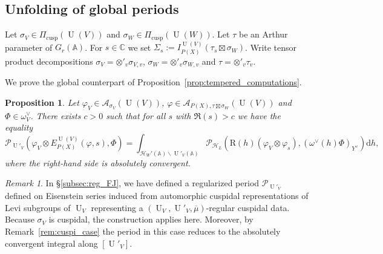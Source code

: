 \documentclass[letterpaper,11pt]{amsart}
\newcommand{\bA}{\mathbb{A}}
\newcommand{\C}{\mathbb{C}}
\newcommand{\cA}{\mathcal{A}}
\newcommand{\cH}{\mathcal{H}}
\newcommand{\cP}{\mathcal{P}}
\newcommand{\rd}{\mathrm{d}}
\newcommand{\<}{\negthickspace}
\DeclareMathOperator{\U}{U}
\DeclareMathOperator{\cusp}{cusp}
\theoremstyle{definition}
\theoremstyle{plain}
\newtheorem{prop}[definition]{Proposition}
\theoremstyle{remark}
\newtheorem{remark}[definition]{Remark}
\numberwithin{equation}{section}
\begin{document}
\subsection{Unfolding of global periods}

Let $\sigma_V \in \Pi_{\cusp}(\U(V))$ and $\sigma_W \in \Pi_{\cusp}(\U(W))$. Let $\tau$ be an Arthur parameter of $G_r(\bA)$. For $s \in \C$ we set $\Sigma_{s}:=I_{P(X)}^{\U(V)} (\tau_s \boxtimes \sigma_W)$. Write tensor product decompositions $\sigma_V=\otimes'_v \sigma_{V,v}$, $\sigma_W=\otimes'_v \sigma_{W,v}$ and $\tau=\otimes'_v \tau_{v}$.

We prove the global counterpart of Proposition~\ref{prop:tempered_computations}.

\begin{prop}
\label{prop:global_corank_reduction}
Let $\varphi_V \in \cA_{\sigma_V}(\U(V))$, $\varphi \in \cA_{P(X),\tau \boxtimes \sigma_W}(\U(V))$ and $\Phi \in \omega^\vee_V$. There exists $c>0$ such that for all $s$ with $\Re(s)>c$ we have the equality
\begin{equation*}
    \cP_{\U'_V}\left(\varphi_V \otimes E_{P(X)}^{\U(V)}(\varphi,s) , \Phi \right) = \int_{\cH_W'(\bA) \backslash \U'_V(\bA)} \cP_{\cH_L} \left( \mathrm{R}(h)(\varphi_V \otimes \varphi_s) , (\omega^\vee(h) \Phi)_{Y^\vee} \right) \rd h,
\end{equation*}
where the right-hand side is absolutely convergent.
\end{prop}

\begin{remark}
    \label{rem:same_period}
    In \S\ref{subsec:reg_FJ}, we have defined a regularized period $\cP_{\U'_V}$ defined on Eisenstein series induced from automorphic cuspidal representations of Levi subgroups of $\U_V$ representing a $(\U_V,\U'_V,\overline{\mu})$-regular cuspidal data. Because $\sigma_V$ is cuspidal, the construction applies here. Moreover, by Remark~\ref{rem:cuspi_case} the period in this case reduces to the absolutely convergent integral along $[\U'_V]$.
\end{remark}
\end{document}

